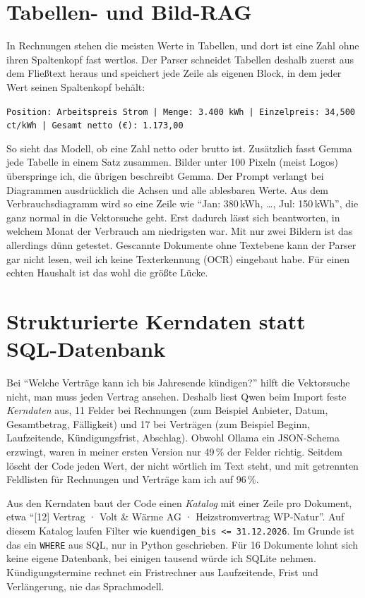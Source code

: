 \section{Tabellen- und Bild-RAG}
\label{sec:tabbild}

In Rechnungen stehen die meisten Werte in Tabellen, und dort ist eine Zahl ohne ihren Spaltenkopf fast wertlos. Der Parser schneidet Tabellen deshalb zuerst aus dem Fließtext heraus und speichert jede Zeile als eigenen Block, in dem jeder Wert seinen Spaltenkopf behält:
\begin{center}\small
\texttt{Position: Arbeitspreis Strom | Menge: 3.400 kWh | Einzelpreis: 34,500 ct/kWh | Gesamt netto (€): 1.173,00}
\end{center}
So sieht das Modell, ob eine Zahl netto oder brutto ist. Zusätzlich fasst Gemma jede Tabelle in einem Satz zusammen. Bilder unter 100 Pixeln (meist Logos) überspringe ich, die übrigen beschreibt Gemma. Der Prompt verlangt bei Diagrammen ausdrücklich die Achsen und alle ablesbaren Werte. Aus dem Verbrauchsdiagramm wird so eine Zeile wie \enquote{Jan: 380\,kWh, \dots, Jul: 150\,kWh}, die ganz normal in die Vektorsuche geht. Erst dadurch lässt sich beantworten, in welchem Monat der Verbrauch am niedrigsten war. Mit nur zwei Bildern ist das allerdings dünn getestet. Gescannte Dokumente ohne Textebene kann der Parser gar nicht lesen, weil ich keine Texterkennung (OCR) eingebaut habe. Für einen echten Haushalt ist das wohl die größte Lücke.

\section{Strukturierte Kerndaten statt SQL-Datenbank}
\label{sec:kerndaten}

Bei \enquote{Welche Verträge kann ich bis Jahresende kündigen?} hilft die Vektorsuche nicht, man muss jeden Vertrag ansehen. Deshalb liest Qwen beim Import feste \emph{Kerndaten} aus, 11 Felder bei Rechnungen (zum Beispiel Anbieter, Datum, Gesamtbetrag, Fälligkeit) und 17 bei Verträgen (zum Beispiel Beginn, Laufzeitende, Kündigungsfrist, Abschlag). Obwohl Ollama ein JSON-Schema erzwingt, waren in meiner ersten Version nur 49\,\% der Felder richtig. Seitdem löscht der Code jeden Wert, der nicht wörtlich im Text steht, und mit getrennten Feldlisten für Rechnungen und Verträge kam ich auf 96\,\%.

Aus den Kerndaten baut der Code einen \emph{Katalog} mit einer Zeile pro Dokument, etwa \enquote{[12] Vertrag · Volt \& Wärme AG · Heizstromvertrag WP-Natur}. Auf diesem Katalog laufen Filter wie \texttt{kuendigen\_bis <= 31.12.2026}. Im Grunde ist das ein \texttt{WHERE} aus SQL, nur in Python geschrieben. Für 16 Dokumente lohnt sich keine eigene Datenbank, bei einigen tausend würde ich SQLite nehmen. Kündigungstermine rechnet ein Fristrechner aus Laufzeitende, Frist und Verlängerung, nie das Sprachmodell.

